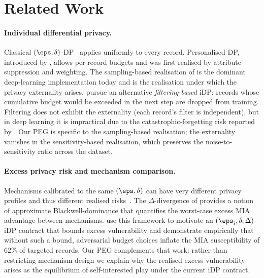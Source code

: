 \section{Related Work}
\label{sec:related}

\paragraph{Individual differential privacy.}
Classical $(\eps,\delta)$-DP~\cite{dwork2006calibrating} applies uniformly to
every record. Personalised DP, introduced by
\citet{jorgensen2015conservative}, allows per-record budgets and was first
realised by attribute suppression and weighting. The sampling-based
realisation of \citet{boenisch2023have} is the dominant deep-learning
implementation today and is the realisation under which the privacy
externality arises. \citet{feldman2021individual} pursue an alternative
\emph{filtering-based} iDP: records whose cumulative budget would be exceeded
in the next step are dropped from training. Filtering does not exhibit the
externality (each record's filter is independent), but in deep learning it
is impractical due to the catastrophic-forgetting risk reported by
\citet{boenisch2023have}. Our PEG is specific to the sampling-based
realisation; the externality vanishes in the sensitivity-based realisation,
which preserves the noise-to-sensitivity ratio across the dataset.

\paragraph{Excess privacy risk and mechanism comparison.}
Mechanisms calibrated to the same $(\eps,\delta)$ can have very different
privacy profiles and thus different realised
risks~\cite{kaissis2024beyond, balle2020privacy, dong2022gaussian}. The
$\Delta$-divergence of \citet{kaissis2024beyond} provides a notion of
approximate Blackwell-dominance that quantifies the worst-case excess MIA
advantage between mechanisms. \citet{kaiser2026your} use this framework to
motivate an $(\eps_i, \delta, \Delta)$-iDP contract that bounds excess
vulnerability and demonstrate empirically that without such a bound,
adversarial budget choices inflate the MIA susceptibility of $62\%$ of
targeted records. Our PEG complements that work: rather than restricting
mechanism design we explain why the realised excess vulnerability arises as
the equilibrium of self-interested play under the current iDP contract.

